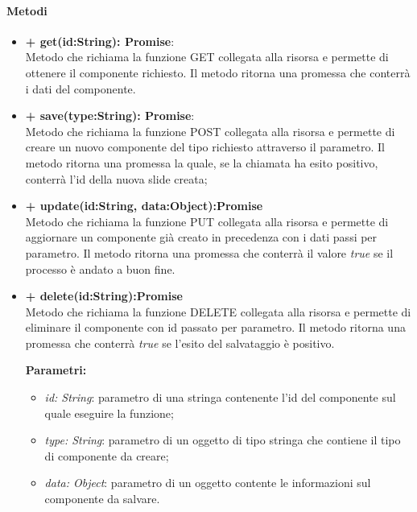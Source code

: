 	\paragraph{Metodi}
	\begin{itemize}
		\item \textbf{+ get(id:String): Promise}:\\
			Metodo che richiama la funzione GET collegata alla risorsa e permette di ottenere il componente richiesto. Il metodo ritorna una promessa che conterrà i dati del componente.
		\item \textbf{+ save(type:String): Promise}:\\
			Metodo che richiama la funzione POST collegata alla risorsa e permette di creare un nuovo componente del tipo richiesto attraverso il parametro. Il metodo ritorna una promessa la quale, se la chiamata ha esito positivo, conterrà l'id della nuova \gls{slide} creata;\\
		\item \textbf{+ update(id:String, data:Object):Promise}\\
			Metodo che richiama la funzione PUT collegata alla risorsa e permette di aggiornare un componente già creato in precedenza con i dati passi per parametro. Il metodo ritorna una promessa che conterrà il valore \textit{true} se il processo è andato a buon fine. 
		\item \textbf{+ delete(id:String):Promise}\\
			Metodo che richiama la funzione DELETE collegata alla risorsa e permette di eliminare il componente con id passato per parametro. Il metodo ritorna una promessa che conterrà \textit{true} se l'esito del salvataggio è positivo.
		
		\textbf{Parametri:}\\
		\begin{itemize}
			\item \textit{id: String}: parametro di una stringa contenente l'id del componente sul quale eseguire la funzione;
			\item \textit{type: String}: parametro di un oggetto di tipo stringa che contiene il tipo di componente da creare;
			\item \textit{data: Object}: parametro di un oggetto contente le informazioni sul componente da salvare.
		\end{itemize}
	\end{itemize}
